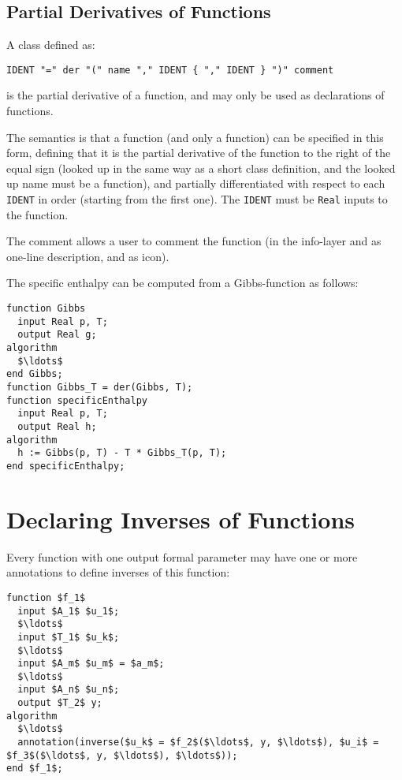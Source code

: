 \subsection{Partial Derivatives of Functions}\label{partial-derivatives-of-functions}

A class defined as:
\begin{lstlisting}[language=grammar]
IDENT "=" der "(" name "," IDENT { "," IDENT } ")" comment
\end{lstlisting}
is the partial derivative of a function, and may only be used as declarations of functions.

The semantics is that a function (and only a function) can be specified in this form, defining that it is the partial derivative of the function to the right of the equal sign (looked up in the same way as a short class definition, and the looked up name must be a function), and partially differentiated with respect to each \lstinline!IDENT! in order (starting from the first one).  The \lstinline!IDENT! must be \lstinline!Real! inputs to the function.

The comment allows a user to comment the function (in the info-layer and as one-line description, and as icon).

\begin{example}
The specific enthalpy can be computed from a Gibbs-function as follows:
\begin{lstlisting}[language=modelica]
function Gibbs
  input Real p, T;
  output Real g;
algorithm
  $\ldots$
end Gibbs;
function Gibbs_T = der(Gibbs, T);
function specificEnthalpy
  input Real p, T;
  output Real h;
algorithm
  h := Gibbs(p, T) - T * Gibbs_T(p, T);
end specificEnthalpy;
\end{lstlisting}
\end{example}

\section{Declaring Inverses of Functions}\label{declaring-inverses-of-functions}

Every function with one output formal parameter may have one or more  annotations to define inverses of this function:
\begin{lstlisting}[language=modelica]
function $f_1$
  input $A_1$ $u_1$;
  $\ldots$
  input $T_1$ $u_k$;
  $\ldots$
  input $A_m$ $u_m$ = $a_m$;
  $\ldots$
  input $A_n$ $u_n$;
  output $T_2$ y;
algorithm
  $\ldots$
  annotation(inverse($u_k$ = $f_2$($\ldots$, y, $\ldots$), $u_i$ = $f_3$($\ldots$, y, $\ldots$), $\ldots$));
end $f_1$;
\end{lstlisting}


